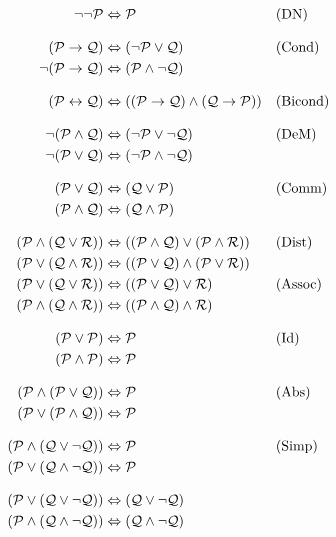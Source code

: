\begin{align*}
\lnot\lnot \mathcal{P} & \Leftrightarrow \mathcal{P} && \text{(DN)}\\[2ex]
(\mathcal{P} \rightarrow \mathcal{Q}) & \Leftrightarrow (\lnot \mathcal{P} \lor \mathcal{Q})
&& \text{(Cond)}\\
\lnot(\mathcal{P} \rightarrow \mathcal{Q}) & \Leftrightarrow (\mathcal{P} \land \lnot\mathcal{Q}) \\[2ex]
(\mathcal{P} \leftrightarrow \mathcal{Q}) & \Leftrightarrow ((\mathcal{P} \rightarrow \mathcal{Q}) \land  (\mathcal{Q} \rightarrow \mathcal{P}))
&& \text{(Bicond)}\\[2ex]
\lnot(\mathcal{P} \land \mathcal{Q}) & \Leftrightarrow (\lnot\mathcal{P} \lor \lnot\mathcal{Q})
&& \text{(DeM)}\\
\lnot(\mathcal{P} \lor \mathcal{Q}) & \Leftrightarrow (\lnot\mathcal{P} \land \lnot\mathcal{Q}) \\[2ex]
(\mathcal{P} \lor \mathcal{Q}) & \Leftrightarrow (\mathcal{Q} \lor \mathcal{P}) & &\text{(Comm)}\\
(\mathcal{P} \land \mathcal{Q}) & \Leftrightarrow (\mathcal{Q} \land \mathcal{P})\\[2ex]
(\mathcal{P} \land (\mathcal{Q} \lor \mathcal{R})) & \Leftrightarrow ((\mathcal{P} \land \mathcal{Q}) \lor (\mathcal{P} \land \mathcal{R}))
&& \text{(Dist)}\\
(\mathcal{P} \lor (\mathcal{Q} \land \mathcal{R})) & \Leftrightarrow ((\mathcal{P} \lor \mathcal{Q}) \land (\mathcal{P} \lor \mathcal{R}))\\
(\mathcal{P} \lor (\mathcal{Q} \lor \mathcal{R})) & \Leftrightarrow ((\mathcal{P} \lor \mathcal{Q}) \lor \mathcal{R}) & &\text{(Assoc)}\\
(\mathcal{P} \land (\mathcal{Q} \land \mathcal{R})) & \Leftrightarrow ((\mathcal{P} \land \mathcal{Q}) \land \mathcal{R})\\[2ex]
(\mathcal{P} \lor \mathcal{P}) & \Leftrightarrow \mathcal{P} && \text{(Id)}\\
(\mathcal{P} \land \mathcal{P}) & \Leftrightarrow \mathcal{P}\\[2ex]
(\mathcal{P} \land (\mathcal{P} \lor \mathcal{Q})) & \Leftrightarrow \mathcal{P}&& \text{(Abs)}\\
(\mathcal{P} \lor (\mathcal{P} \land \mathcal{Q})) & \Leftrightarrow \mathcal{P}\\[2ex]
(\mathcal{P} \land (\mathcal{Q} \lor \lnot\mathcal{Q})) & \Leftrightarrow \mathcal{P}  && \text{(Simp)}\\
(\mathcal{P} \lor (\mathcal{Q} \land \lnot\mathcal{Q})) & \Leftrightarrow \mathcal{P}\\[2ex]
(\mathcal{P} \lor (\mathcal{Q} \lor \lnot\mathcal{Q})) & \Leftrightarrow (\mathcal{Q} \lor \lnot\mathcal{Q}) \\
(\mathcal{P} \land (\mathcal{Q} \land \lnot\mathcal{Q})) & \Leftrightarrow (\mathcal{Q} \land \lnot\mathcal{Q})
\end{align*}
